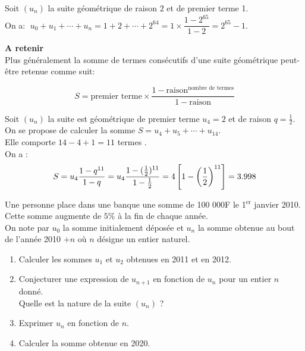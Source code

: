   
  \begin{example}
  
  Soit $ (u_n) $  la suite géométrique de raison $ 2 $ et de premier terme 1.\\
  On a:\;  $ \;u_0+u_1+\cdots +u_n =1+2+ \cdots +2^{64}=1\times\dfrac{1-2^{65}}{1-2}=2^{65} -1$.
  
  \end{example}
 

   \textbf{\color{blue}A retenir} \\
   Plus généralement la somme de termes consécutifs d'une suite géométrique peut-être retenue comme suit:
  
   \[S=\textrm{premier terme}\times\dfrac{1-\textrm{raison}^{\textrm{nombre de termes}}}{1-\textrm{raison}}\]
\begin{example}

 Soit $(u_{n})$ la  suite est géométrique  de premier terme $u_{4}= 2$ et de raison $ q= \frac{1}{2}$.\\ On se propose de calculer la somme  $ S=u_{4}+u_{5}+\cdots +u_{14}$. \\
 Elle comporte $ 14-4+1 =11$ termes . \\ On a :
$$ S=u_{4}\dfrac{1-q^{11}}{1-q} =u_{4}\dfrac{1-(\frac{1}{2})^{11}}{1-\frac{1}{2}}= 4\left[ 1-\left(\frac{1}{2}\right)^{11} \right]=3.998$$
\end{example}
 
   
   
 \begin{example}

 \medskip
           Une personne place dans une banque une somme de 100 000F le 1$^{\text{er}} $  janvier 2010. \\Cette somme  augmente de $5\%$  à la fin de chaque année.\\
           On note par $ u_0 $ la somme initialement déposée et $ u_n $  la somme obtenue  au bout de l'année 2010 $ +n $ où $ n $  désigne un entier naturel.
           \begin{enumerate}
           \item Calculer les sommes  $ u_1 $  et $ u_2 $ obtenues  en 2011 et en 2012.
           \item  Conjecturer une expression de  $u_{n+1} $ en fonction de  $ u_n$ pour un entier $ n $ donné.\\Quelle est la nature de la suite $( u_n )$ ?
           \item Exprimer  $ u_n $ en fonction de $ n $.
           \item  Calculer la somme obtenue en 2020.
           \end{enumerate}
            \end{example}
           \bigskip
           
